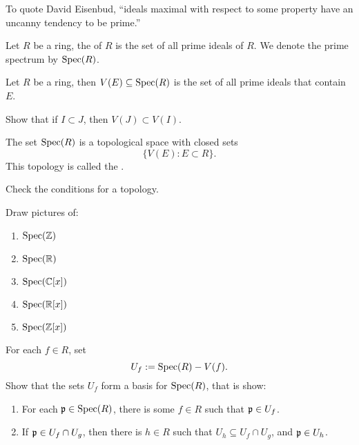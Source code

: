 \documentclass{ximera}
\begin{document}
To quote David Eisenbud, ``ideals maximal with respect to some
property have an uncanny tendency to be prime.''



\begin{definition}
  Let $R$ be a ring, the  of $R$ is the set of all
  prime ideals of $R$. We denote the prime spectrum by $\operatorname{Spec}(R)$.
\end{definition}

\begin{definition}
  Let $R$ be a ring, then $V(E)\subseteq \operatorname{Spec}(R)$ is the set of all
  prime ideals that contain $E$.
\end{definition}

\begin{exercise}
  Show that if $I\subset J$, then $V(J) \subset V(I)$.
\end{exercise}

\begin{proposition}
  The set $\operatorname{Spec}(R)$ is a topological space with closed sets
  \[
  \{ V(E):E\subset R\}.
  \]
  This topology is called the .
  \begin{sketch}
    Check the conditions for a topology.
  \end{sketch}
\end{proposition}

\begin{exercise}%
  Draw pictures of:
  \begin{enumerate}
  \item $\operatorname{Spec}(\mathbb Z)$
  \item $\operatorname{Spec}(\mathbb R)$
  \item $\operatorname{Spec}(\mathbb C[x])$
  \item $\operatorname{Spec}(\mathbb R[x])$
  \item $\operatorname{Spec}(\mathbb Z[x])$
  \end{enumerate}
\end{exercise}


\begin{exercise}
  For each $f\in R$, set
  \[
  U_f := \operatorname{Spec}(R) - V(f).
  \]
  Show that the sets $U_f$ form a basis for $\operatorname{Spec}(R)$, that is show:
  \begin{enumerate}
    \item For each $\mathfrak{p}\in\operatorname{Spec}(R)$, there is some $f\in R$ such that
      $\mathfrak{p}\in U_f$.
    \item If $\mathfrak{p}\in U_f \cap U_g$, then there is $h\in R$ such that
      $U_h\subseteq U_f\cap U_g$, and $\mathfrak{p}\in U_h$.
  \end{enumerate}
\end{exercise}
\end{document}
